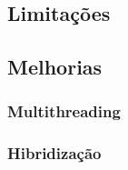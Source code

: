     \subsection{Limitações}


    \subsection{Melhorias}

        \subsubsection{Multithreading}

        \subsubsection{Hibridização}
        


